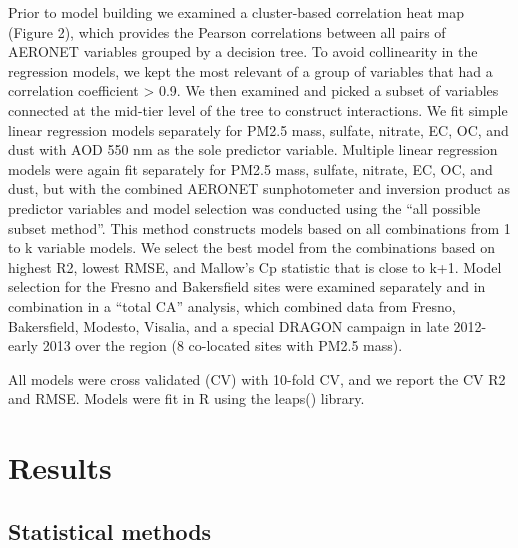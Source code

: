 \documentclass[, manuscript]{copernicus}
\begin{document}
Prior to model building we examined a cluster-based correlation heat map
(Figure 2), which provides the Pearson correlations between all pairs of
AERONET variables grouped by a decision tree. To avoid collinearity in
the regression models, we kept the most relevant of a group of variables
that had a correlation coefficient \textgreater{}
\textbar{}0.9\textbar{}. We then examined and picked a subset of
variables connected at the mid-tier level of the tree to construct
interactions. We fit simple linear regression models separately for
PM2.5 mass, sulfate, nitrate, EC, OC, and dust with AOD 550 nm as the
sole predictor variable. Multiple linear regression models were again
fit separately for PM2.5 mass, sulfate, nitrate, EC, OC, and dust, but
with the combined AERONET sunphotometer and inversion product as
predictor variables and model selection was conducted using the ``all
possible subset method''. This method constructs models based on all
combinations from 1 to k variable models. We select the best model from
the combinations based on highest R2, lowest RMSE, and Mallow's Cp
statistic that is close to k+1. Model selection for the Fresno and
Bakersfield sites were examined separately and in combination in a
``total CA'' analysis, which combined data from Fresno, Bakersfield,
Modesto, Visalia, and a special DRAGON campaign in late 2012-early 2013
over the region (8 co-located sites with PM2.5 mass).

All models were cross validated (CV) with 10-fold CV, and we report the
CV R2 and RMSE. Models were fit in R using the leaps() library.

\section{Results}

\subsection{Statistical methods}
\end{document}
